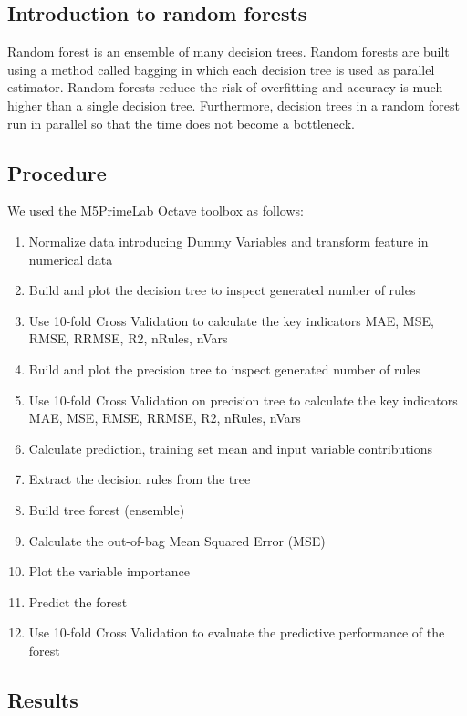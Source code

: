 \documentclass{article}
\begin{document}
\subsection{Introduction to random forests}
Random forest is an ensemble of many decision trees. Random forests are built using a method called bagging in which each decision tree is used as parallel estimator.
Random forests reduce the risk of overfitting and accuracy is much higher than a single decision tree. Furthermore, decision trees in a random forest run in parallel so that the time does not become a bottleneck.


\subsection{Procedure}
We used the M5PrimeLab Octave toolbox as follows:
\begin{enumerate}  
	\item Normalize data introducing Dummy Variables and transform feature in numerical data
	\item Build and plot the decision tree to inspect generated number of rules
	\item Use 10-fold Cross Validation to calculate the key indicators MAE, MSE, RMSE, RRMSE, R2, nRules, nVars
	\item Build and plot the precision tree to inspect generated number of rules
	\item Use 10-fold Cross Validation on precision tree to calculate the key indicators MAE, MSE, RMSE, RRMSE, R2, nRules, nVars
	\item Calculate prediction, training set mean and input variable contributions
	\item Extract the decision rules from the tree
	\item Build tree forest (ensemble) 
	\item Calculate the out-of-bag Mean Squared Error (MSE) 
	\item Plot the variable importance
	\item Predict the forest
	\item Use 10-fold Cross Validation to evaluate the predictive performance of the forest
\end{enumerate}

\subsection{Results}
\end{document}
